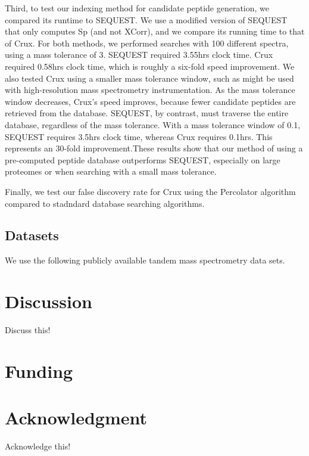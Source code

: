 \documentclass{bioinfo}
\begin{document}
Third, to test our indexing method for candidate peptide generation,
we compared its runtime to SEQUEST.  We use a modified version of
SEQUEST that only computes Sp (and not XCorr), and we compare its
running time to that of Crux.  For both methods, we performed searches
with 100 different spectra, using a mass tolerance of 3.  SEQUEST
required 3.55hrs clock time. Crux required 0.58hrs clock time, which
is roughly a six-fold speed improvement. We also tested Crux using a
smaller mass tolerance window, such as might be used with
high-resolution mass spectrometry instrumentation.  As the mass
tolerance window decreases, Crux's speed improves, because fewer
candidate peptides are retrieved from the database.  SEQUEST, by
contrast, must traverse the entire database, regardless of the mass
tolerance.  With a mass tolerance window of 0.1, SEQUEST requires
3.5hrs clock time, whereas Crux requires 0.1hrs.  This represents an
30-fold improvement.These results show that our method of using a
pre-computed peptide database outperforms SEQUEST, especially on large
proteomes or when searching with a small mass tolerance.

Finally, we test our false discovery rate for Crux using the
Percolator algorithm compared to stadndard database searching
algorithms.

\subsection*{Datasets}
We use the following publicly available tandem mass spectrometry data
sets.

\section{Discussion}
Discuss this!

\section*{Funding}

\section*{Acknowledgment}

Acknowledge this!





 
\end{document}

